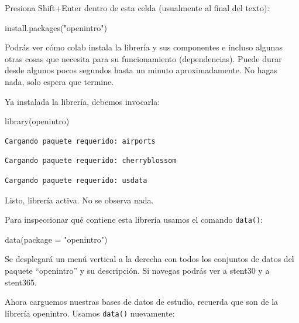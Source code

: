 \documentclass[
  spanish,
  letterpaper,
  DIV=11,
  numbers=noendperiod]{scrartcl}
\newenvironment{Shaded}{\begin{snugshade}}{\end{snugshade}}
\newcommand{\AttributeTok}[1]{\textcolor[rgb]{0.40,0.45,0.13}{#1}}
\newcommand{\FunctionTok}[1]{\textcolor[rgb]{0.28,0.35,0.67}{#1}}
\newcommand{\NormalTok}[1]{\textcolor[rgb]{0.00,0.23,0.31}{#1}}
\newcommand{\StringTok}[1]{\textcolor[rgb]{0.13,0.47,0.30}{#1}}
\begin{document}
Presiona Shift+Enter dentro de esta celda (usualmente al final del
texto):

\begin{Shaded}
\begin{Highlighting}[]
\FunctionTok{install.packages}\NormalTok{(}\StringTok{"openintro"}\NormalTok{)}
\end{Highlighting}
\end{Shaded}

Podrás ver cómo colab instala la librería y sus componentes e incluso
algunas otras cosas que necesita para su funcionamiento (dependencias).
Puede durar desde algunos pocos segundos hasta un minuto
aproximadamente. No hagas nada, solo espera que termine.

Ya instalada la librería, debemos invocarla:

\begin{Shaded}
\begin{Highlighting}[]
\FunctionTok{library}\NormalTok{(openintro)}
\end{Highlighting}
\end{Shaded}

\begin{verbatim}
Cargando paquete requerido: airports
\end{verbatim}

\begin{verbatim}
Cargando paquete requerido: cherryblossom
\end{verbatim}

\begin{verbatim}
Cargando paquete requerido: usdata
\end{verbatim}

Listo, librería activa. No se observa nada.

Para inspeccionar qué contiene esta librería usamos el comando
\texttt{data()}:

\begin{Shaded}
\begin{Highlighting}[]
\FunctionTok{data}\NormalTok{(}\AttributeTok{package =} \StringTok{"openintro"}\NormalTok{)}
\end{Highlighting}
\end{Shaded}

Se desplegará un menú vertical a la derecha con todos los conjuntos de
datos del paquete ``openintro'' y su descripción. Si navegas podrás ver
a stent30 y a stent365.

Ahora carguemos nuestras bases de datos de estudio, recuerda que son de
la librería openintro. Usamos \texttt{data()} nuevamente:
\end{document}
